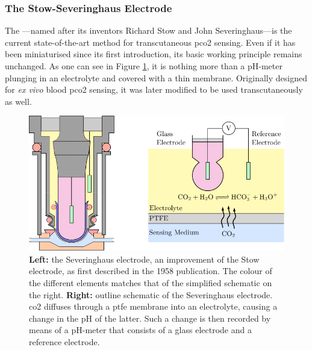 \subsubsection{The Stow-Severinghaus Electrode}\label{subsect:choos:review:ssel}

The \ssel---named after its inventors Richard Stow\cite{severinghaus1986_3} and John Severinghaus\cite{severinghaus1958}---is the current state-of-the-art method for transcutaneous \gls{pco2} sensing\cite{conway2018}. Even if it has been miniaturised since its first introduction, its basic working principle remains unchanged. As one can see in Figure \ref{fig:choos:review:ssel_outline}, it is nothing more than a pH-meter plunging in an electrolyte and covered with a thin membrane. Originally designed for \emph{ex vivo} blood \gls{pco2} sensing, it was later modified to be used transcutaneously as well\cite{beran1976}.

\begin{figure}
	\centering
	\includegraphics{1_main_matter/choos_figures/review/ssel_converted}
	\caption[The Stow-Severinghaus electrode.]{\textbf{Left:} the Severinghaus electrode, an improvement of the Stow electrode, as first described in the 1958 publication\cite{severinghaus1958}. The colour of the different elements matches that of the simplified schematic on the right. \textbf{Right:} outline schematic of the Severinghaus electrode. \gls{co2} diffuses through a \gls{ptfe} membrane into an electrolyte, causing a change in the pH of the latter. Such a change is then recorded by means of a pH-meter that consists of a glass electrode and a reference electrode.}
	\label{fig:choos:review:ssel_outline}
\end{figure}

